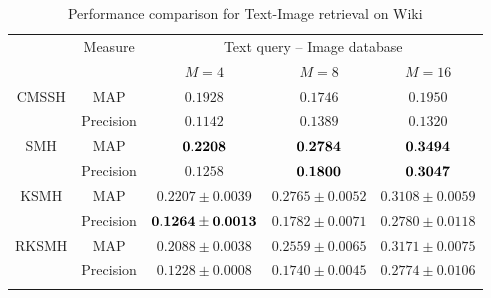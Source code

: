 \begin{table}[htb]\small
\caption{Performance comparison for Text-Image retrieval on \mbox{Wiki}}\label{table:comp-wiki-cross-ti}\vspace{-0.5cm}
\begin{center}
\begin{tabular}{|c|c|c|c|c|}
\toprule[1pt]\addlinespace[0pt]
    \multirow{2}{*}{Method}&  \multirow{2}{*}{Measure}  &  \multicolumn{3}{|c|}{Text query -- Image database}\\
\cline{3-5}%
&&$M=4$&$M=8$&$M=16$\\
\hline
\multirow{2}{*}{CMSSH}&{MAP}     &$  0.1928  $&$   0.1746 $& $     0.1950   $\\
\cline{2-5}%
&{Precision}    & $0.1142$&$   0.1389    $&$    0.1320    $\\
\hline%
\multirow{2}{*}{SMH}&MAP        &${\bf 0.2208}       $&$ {\bf0.2784}  $&$ {\bf0.3494} $\\
\cline{2-5}%
&{Precision}    &$0.1258      $&$ {\bf0.1800}   $&$ {\bf0.3047} $\\
\hline%
\multirow{2}{*}{KSMH}&MAP        & $0.2207\pm0.0039$& $ 0.2765\pm 0.0052 $&$ 0.3108\pm 0.0059 $\\
\cline{2-5}%
&{Precision}    & ${\bf 0.1264\pm0.0013}$&$ 0.1782\pm 0.0071 $&$ 0.2780\pm 0.0118 $\\
\hline%
\multirow{2}{*}{RKSMH}&MAP & $0.2088\pm0.0038$&$ 0.2559\pm 0.0065 $&$ 0.3171\pm 0.0075 $\\
\cline{2-5}%
&{Precision}   &$0.1228        \pm0.0008       $&$ 0.1740\pm  0.0045 $&$ 0.2774\pm 0.0106  $\\
\addlinespace[0pt]\bottomrule[1pt]
\end{tabular}
\end{center}
\end{table}

